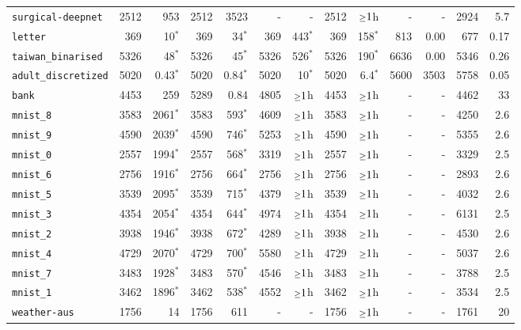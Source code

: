 \begin{tabular}{lrrrrrrrrrrrr}
\texttt{surgical-deepnet} & 2512 & 953 & 2512 & 3523 & - & - & 2512 & $\mathsmaller{\geq}1$h & - & - & 2924 & 5.7\\
\texttt{letter} & 369 & 10$^*$ & 369 & 34$^*$ & 369 & 443$^*$ & 369 & 158$^*$ & 813 & 0.00 & 677 & 0.17\\
\texttt{taiwan\_binarised} & 5326 & 48$^*$ & 5326 & 45$^*$ & 5326 & 526$^*$ & 5326 & 190$^*$ & 6636 & 0.00 & 5346 & 0.26\\
\texttt{adult\_discretized} & 5020 & 0.43$^*$ & 5020 & 0.84$^*$ & 5020 & 10$^*$ & 5020 & 6.4$^*$ & 5600 & 3503 & 5758 & 0.05\\
\texttt{bank} & 4453 & 259 & 5289 & 0.84 & 4805 & $\mathsmaller{\geq}1$h & 4453 & $\mathsmaller{\geq}1$h & - & - & 4462 & 33\\
\texttt{mnist\_8} & 3583 & 2061$^*$ & 3583 & 593$^*$ & 4609 & $\mathsmaller{\geq}1$h & 3583 & $\mathsmaller{\geq}1$h & - & - & 4250 & 2.6\\
\texttt{mnist\_9} & 4590 & 2039$^*$ & 4590 & 746$^*$ & 5253 & $\mathsmaller{\geq}1$h & 4590 & $\mathsmaller{\geq}1$h & - & - & 5355 & 2.6\\
\texttt{mnist\_0} & 2557 & 1994$^*$ & 2557 & 568$^*$ & 3319 & $\mathsmaller{\geq}1$h & 2557 & $\mathsmaller{\geq}1$h & - & - & 3329 & 2.5\\
\texttt{mnist\_6} & 2756 & 1916$^*$ & 2756 & 664$^*$ & 2756 & $\mathsmaller{\geq}1$h & 2756 & $\mathsmaller{\geq}1$h & - & - & 2893 & 2.6\\
\texttt{mnist\_5} & 3539 & 2095$^*$ & 3539 & 715$^*$ & 4379 & $\mathsmaller{\geq}1$h & 3539 & $\mathsmaller{\geq}1$h & - & - & 4032 & 2.6\\
\texttt{mnist\_3} & 4354 & 2054$^*$ & 4354 & 644$^*$ & 4974 & $\mathsmaller{\geq}1$h & 4354 & $\mathsmaller{\geq}1$h & - & - & 6131 & 2.5\\
\texttt{mnist\_2} & 3938 & 1946$^*$ & 3938 & 672$^*$ & 4289 & $\mathsmaller{\geq}1$h & 3938 & $\mathsmaller{\geq}1$h & - & - & 4530 & 2.6\\
\texttt{mnist\_4} & 4729 & 2070$^*$ & 4729 & 700$^*$ & 5580 & $\mathsmaller{\geq}1$h & 4729 & $\mathsmaller{\geq}1$h & - & - & 5037 & 2.6\\
\texttt{mnist\_7} & 3483 & 1928$^*$ & 3483 & 570$^*$ & 4546 & $\mathsmaller{\geq}1$h & 3483 & $\mathsmaller{\geq}1$h & - & - & 3788 & 2.5\\
\texttt{mnist\_1} & 3462 & 1896$^*$ & 3462 & 538$^*$ & 4552 & $\mathsmaller{\geq}1$h & 3462 & $\mathsmaller{\geq}1$h & - & - & 3534 & 2.5\\
\texttt{weather-aus} & 1756 & 14 & 1756 & 611 & - & - & 1756 & $\mathsmaller{\geq}1$h & - & - & 1761 & 20\\
\bottomrule
\end{tabular}
